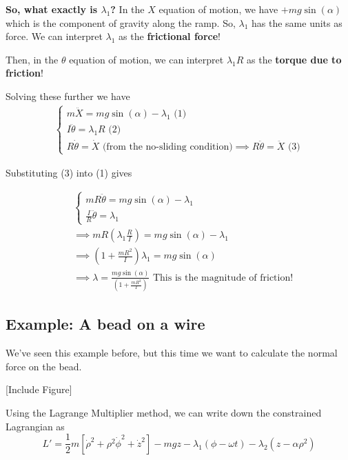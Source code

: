 \documentclass[11pt]{article}
\begin{document}
\begin{redbox}
  \textbf{So, what exactly is $\lambda_1$? }
  \vskip 0.5cm
  In the $X$ equation of motion, we have $+mg\sin(\alpha)$ which is the component of gravity along the ramp. So, $\lambda_1$ has the same units as force. We can interpret $\lambda_1$ as the \textbf{frictional force}! 

  \vskip 0.5cm
  Then, in the $\theta$ equation of motion, we can interpret $\lambda_1 R$ as the \textbf{torque due to friction}!
\end{redbox}

Solving these further we have 
\begin{align*}
  \begin{cases}
    m \ddot{X} = mg\sin(\alpha) - \lambda_1 \text{ (1)}\\
    I \ddot{\theta} = \lambda_1 R \text{ (2)}\\
    R \dot{\theta} = \dot{X} \text{ (from the no-sliding condition)} \implies R \ddot{\theta} = \ddot{X} \text{ (3)}
  \end{cases}
\end{align*}

Substituting (3) into (1) gives

\begin{align*}
  &\begin{cases}
    mR \ddot{\theta} = mg \sin(\alpha) - \lambda_1 \\
    \frac{I}{R} \ddot{\theta} = \lambda_1
  \end{cases} \\ &\implies mR \left( \lambda_1 \frac{R}{I} \right) = mg\sin(\alpha) - \lambda_1 \\
  &\implies \left( 1 + \frac{mR^2}{I} \right) \lambda_1 = mg \sin(\alpha) \\
  &\implies \boxed{\lambda = \frac{mg \sin(\alpha)}{\left(1 + \frac{mR^2}{I}\right)}} \text{ This is the magnitude of friction!}
\end{align*}

\vskip 1cm
\subsection{Example: A bead on a wire}

\vskip 0.5cm
We've seen this example before, but this time we want to calculate the normal force on the bead.

\vskip 0.5cm
[Include Figure]

\vskip 0.5cm
Using the Lagrange Multiplier method, we can write down the constrained Lagrangian as 
\[ L' = \frac{1}{2}m \left[ \dot{\rho}^2 + \rho^2 \dot{\phi}^2 + \dot{z}^2 \right] -mgz - \lambda_1 \left(\phi - \omega t\right) - \lambda_2 \left(z - \alpha \rho^2\right) \]
\end{document}
